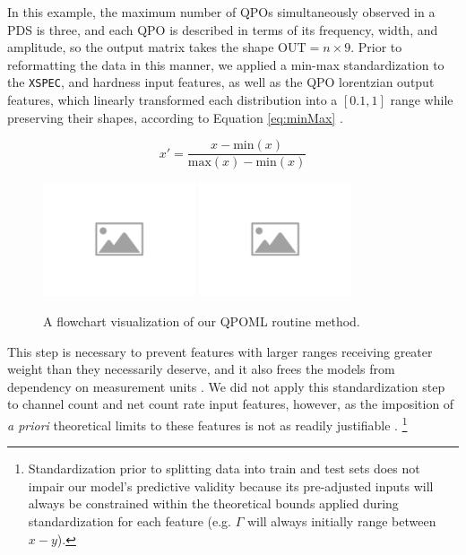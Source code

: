 \documentclass[fleqn,usenatbib]{mnras}
\begin{document}
In this example, the maximum number of QPOs simultaneously observed in a PDS is three, and each QPO is described in terms of its frequency, width, and amplitude, so the output matrix takes the shape $\mathrm{OUT}=n\times9$. Prior to reformatting the data in this manner, we applied a min-max standardization to the \texttt{XSPEC}, and hardness input features, as well as the QPO lorentzian output features, which linearly transformed each distribution into a $[0.1,1]$ range while preserving their shapes, according to Equation \ref{eq:minMax} \citep{Kandanaarachchi2019}.

\begin{equation}
    x' = \frac{x-\mathrm{min}(x)}{\mathrm{max}(x)-\mathrm{min}(x)}\label{eq:minMax}
\end{equation}

\begin{figure}
    \centering
    \includegraphics[width=0.4\textwidth]{figures/placeholder-image.png}
    \includegraphics[width=0.4\textwidth]{figures/placeholder-image.png}
    \caption{A flowchart visualization of our QPOML routine method.}
    \label{fig:flowchart}
\end{figure}

This step is necessary to prevent features with larger ranges receiving greater weight than they necessarily deserve, and it also frees the models from dependency on measurement units \citep{Akanbi2015, Han2012}. We did not apply this standardization step to channel count and net count rate input features, however, as the imposition of \textit{a priori} theoretical limits to these features is not as readily justifiable \citep{Pattnaik2020}.  \footnote{Standardization prior to splitting data into train and test sets does not impair our model's predictive validity because its pre-adjusted inputs will always be constrained within the theoretical bounds applied during standardization for each feature (e.g. $\Gamma$ will always initially range between $x-y$).}
\end{document}
